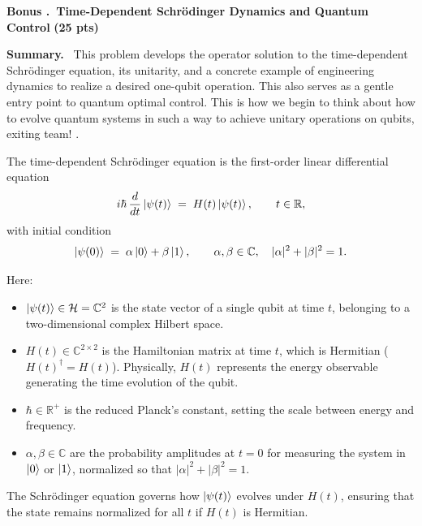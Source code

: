 \documentclass[11pt]{article}
\newcommand{\pts}[1]{\hfill{\small\bfseries(#1 pts)}}
\newenvironment{summary}{\vspace{2pt}\noindent\textbf{Summary.}~}{\par\vspace{6pt}}
\newcounter{problem}
\newcounter{bonus}
\newcommand{\bonus}[2]{%
  \refstepcounter{bonus}
  \vspace{10pt}\noindent\textbf{Bonus \Alph{bonus}.~#1} \pts{#2}\par
}
\begin{document}
\bonus{Time-Dependent Schr\"odinger Dynamics and Quantum Control}{25}
\begin{summary}
This problem develops the operator solution to the time-dependent Schr\"odinger equation, its unitarity, and a concrete example of engineering dynamics to realize a desired one-qubit operation. This also serves as a gentle entry point to quantum optimal control. This is how we begin to think about how to evolve quantum systems in such a way to achieve unitary operations on qubits, exiting team! \smiley{}.

The time-dependent Schr\"odinger equation is the first-order linear differential equation
\[
i\hbar \,\frac{d}{dt}\ket{\psi(t)} \;=\; H(t)\ket{\psi(t)}, 
\qquad t \in \mathbb{R},
\]
with initial condition
\[
\ket{\psi(0)} \;=\; \alpha \ket{0} + \beta \ket{1}, 
\qquad \alpha, \beta \in \mathbb{C}, \quad |\alpha|^2 + |\beta|^2 = 1.
\]

Here:
\begin{itemize}
  \item $\ket{\psi(t)} \in \mathcal{H} = \mathbb{C}^2$ is the state vector of a single qubit at time $t$, belonging to a two-dimensional complex Hilbert space.
  \item $H(t) \in \mathbb{C}^{2\times 2}$ is the Hamiltonian matrix at time $t$, which is Hermitian ($H(t)^\dagger = H(t)$). Physically, $H(t)$ represents the energy observable generating the time evolution of the qubit.
  \item $\hbar \in \mathbb{R}^+$ is the reduced Planck’s constant, setting the scale between energy and frequency.
  \item $\alpha, \beta \in \mathbb{C}$ are the probability amplitudes at $t=0$ for measuring the system in $\ket{0}$ or $\ket{1}$, normalized so that $|\alpha|^2 + |\beta|^2 = 1$.
\end{itemize}

The Schr\"odinger equation governs how $\ket{\psi(t)}$ evolves under $H(t)$, ensuring that the state remains normalized for all $t$ if $H(t)$ is Hermitian.

\end{summary}
\end{document}
